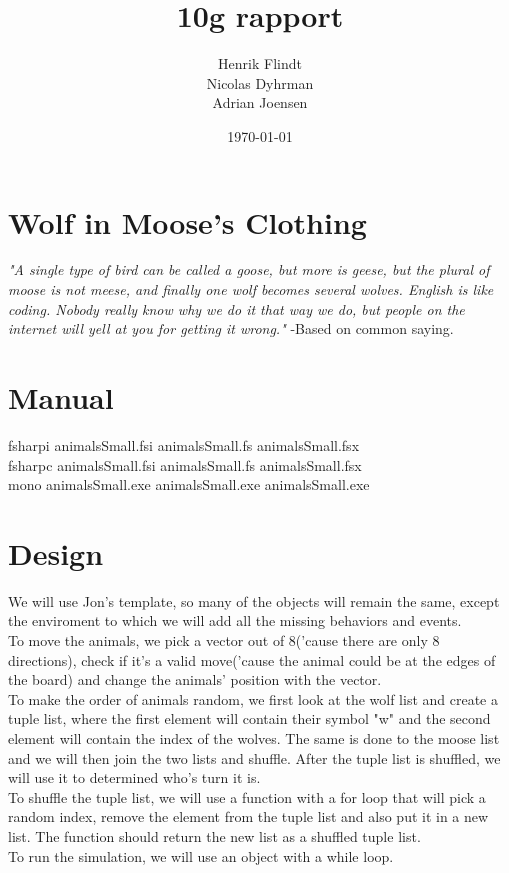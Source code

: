 \documentclass{article}
\title{10g rapport}
\author{Henrik Flindt\\Nicolas Dyhrman\\Adrian Joensen}
\date{\today}
\begin{document}
    \maketitle
    
    \section*{Wolf in Moose's Clothing}
    \textit{"A single type of bird can be called a goose, but more is geese, but the plural of moose is not meese, and finally one wolf becomes several wolves. English is like coding. Nobody really know why we do it that way we do, but people on the internet will yell at you for getting it wrong."} \newline -Based on common saying.
    \section{Manual}
   		fsharpi animalsSmall.fsi animalsSmall.fs animalsSmall.fsx
   		\\
   		fsharpc animalsSmall.fsi animalsSmall.fs animalsSmall.fsx
    	\\
    	mono animalsSmall.exe animalsSmall.exe animalsSmall.exe
    \section{Design}
    	We will use Jon's template, so many of the objects will remain the same, except the enviroment to which we will add all the missing behaviors and events.
    	\\
    	To move the animals, we pick a vector out of 8('cause there are only 8 directions), check if it's a valid move('cause  the animal could be at the edges of the board) and change the animals' position with the vector.
    	\\
    	To make the order of animals random, we first look at the wolf list and create a tuple list, where the first element will contain their symbol "w" and the second element will contain the index of the wolves. The same is done to the moose list and we will then join the two lists and shuffle. After the tuple list is shuffled, we will use it to determined who's turn it is.
    	\\
    	To shuffle the tuple list, we will use a function with a for loop that will pick a random index, remove the element from the tuple list and also put it in a new list. The function should return the new list as a shuffled tuple list.
    	\\
    	To run the simulation, we will use an object with a while loop.
\end{document}
